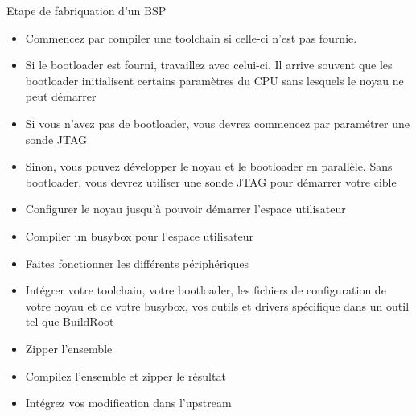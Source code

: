 \begin{frame}[fragile=singleslide]{Etape de fabriquation d'un BSP}
  \begin{itemize}
  \item  Commencez par compiler  une toolchain  si celle-ci  n'est pas
    fournie.
  \item  Si le  bootloader est  fourni, travaillez  avec  celui-ci. Il
    arrive souvent que les bootloader initialisent certains paramètres
    du CPU sans lesquels le noyau ne peut démarrer
  \item Si  vous n'avez pas  de bootloader, vous devrez  commencez par
    paramétrer une sonde JTAG
  \item  Sinon, vous  pouvez développer  le  noyau et  le bootloader  en
    parallèle. Sans  bootloader, vous  devrez utiliser une  sonde JTAG
    pour démarrer votre cible
  \item  Configurer   le  noyau  jusqu'à   pouvoir  démarrer  l'espace
    utilisateur
  \item Compiler un busybox pour l'espace utilisateur
  \item Faites fonctionner les différents périphériques
  \item Intégrer  votre toolchain,  votre bootloader, les  fichiers de
    configuration de  votre noyau et  de votre busybox, vos  outils et
    drivers spécifique dans un outil tel que BuildRoot
  \item Zipper l'ensemble
  \item Compilez l'ensemble et zipper le résultat
  \item Intégrez vos modification dans l'upstream
  \end{itemize}
\end{frame} 




